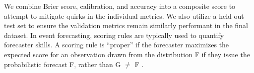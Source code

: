 \documentclass[12pt,a4paper]{article}
\begin{document}
We combine Brier score, calibration, and accuracy into a composite score to attempt to mitigate quirks in the individual metrics. We also utilize a held-out test set to ensure the validation metrics remain similarly performant in the final dataset. In event forecasting, scoring rules are typically used to quantify forecaster skills. A scoring rule is ``proper'' if the forecaster maximizes the expected score for an observation drawn from the distribution F if they issue the probabilistic forecast F, rather than G $\neq$ F .


\end{document}
